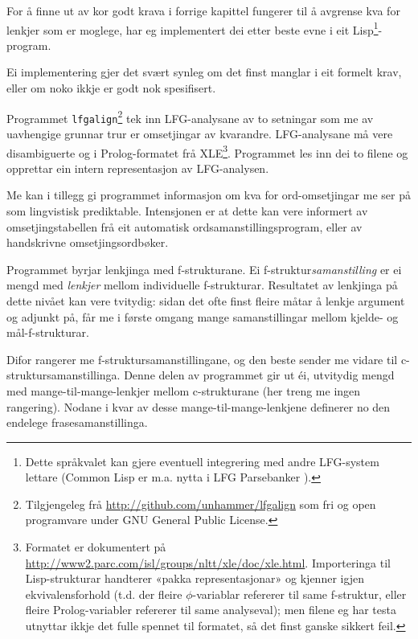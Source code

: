 \documentclass[11pt,a4paper,oneside,draft]{book}
\begin{document}
For å finne ut av kor godt krava i forrige kapittel fungerer til å
avgrense kva for lenkjer som er moglege, har eg implementert dei etter
beste evne i eit Lisp\footnote{Dette språkvalet kan gjere eventuell integrering med andre
        LFG-system lettare (Common Lisp er m.a. nytta i LFG
        Parsebanker \citep{rosen2009lpt}). }-program.

 Ei implementering gjer det svært synleg om det finst
manglar i eit formelt krav, eller om noko ikkje er godt nok
spesifisert.

Programmet \texttt{lfgalign}\footnote{Tilgjengeleg frå \href{http://github.com/unhammer/lfgalign}{http://github.com/unhammer/lfgalign} som fri og
       open programvare under GNU General Public License. } tek inn LFG-analysane av to
setningar som me av uavhengige grunnar trur er omsetjingar av
kvarandre. LFG-analysane må vere disambiguerte og i Prolog-formatet
frå XLE\footnote{Formatet er dokumentert på
       \href{http://www2.parc.com/isl/groups/nltt/xle/doc/xle.html}{http://www2.parc.com/isl/groups/nltt/xle/doc/xle.html}. Importeringa
       til Lisp-strukturar handterer «pakka representasjonar» og
       kjenner igjen ekvivalensforhold (t.d. der fleire
       $\phi$-variablar refererer til same f-struktur, eller fleire
       Prolog-variabler refererer til same analyseval); men filene eg
       har testa utnyttar ikkje det fulle spennet til formatet, så det
       finst ganske sikkert feil. }. Programmet les inn dei to filene og opprettar ein
intern representasjon av LFG-analysen.  

Me kan i tillegg gi programmet informasjon om kva for ord-omsetjingar
me ser på som lingvistisk prediktable. Intensjonen er at dette kan
vere informert av omsetjingstabellen frå eit automatisk
ordsamanstillingsprogram, eller av handskrivne omsetjingsordbøker.

Programmet byrjar lenkjinga med f-strukturane. Ei
f-struktur\emph{samanstilling} er ei mengd med \emph{lenkjer} mellom
individuelle f-strukturar. Resultatet av lenkjinga på dette nivået kan
vere tvitydig: sidan det ofte finst fleire måtar å lenkje argument og
adjunkt på, får me i første omgang mange samanstillingar mellom
kjelde- og mål-f-strukturar.

Difor rangerer me f-struktursamanstillingane, og den beste sender me
vidare til c-struktursamanstillinga. Denne delen av programmet gir ut
éi, utvitydig mengd med mange-til-mange-lenkjer mellom c-strukturane
(her treng me ingen rangering). Nodane i kvar av desse
mange-til-mange-lenkjene definerer no den endelege
frasesamanstillinga.
\end{document}
